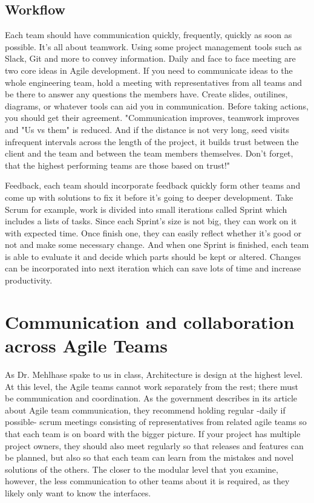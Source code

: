 \documentclass[sigplan,screen]{acmart}
\begin{document}
\subsection{Workflow}
Each team should have communication quickly, frequently, quickly as soon as possible. It's all about teamwork. Using some project management tools such as Slack, Git and more to convey information. Daily and face to face meeting are two core ideas in Agile development. If you need to communicate ideas to the whole engineering team, hold a meeting with representatives from all teams and be there to answer any questions the members have. Create slides, outilines, diagrams, or whatever tools can aid you in communication. \cite{Lulit} Before taking actions, you should get their agreement. "Communication improves, teamwork improves and "Us vs them" is reduced. And if the distance is not very long, seed visits infrequent intervals across the length of the project, it builds trust between the client and the team and between the team members themselves. Don't forget, that the highest performing teams are those based on trust!"\cite{David}

Feedback, each team should incorporate feedback quickly form other teams and come up with solutions to fix it before it's going to deeper development. Take Scrum for example, work is divided into small iterations called Sprint which includes a lists of tasks. Since each Sprint's size is not big, they can work on it with expected time. Once finish one, they can easily reflect whether it's good or not and make some necessary change. And when one Sprint is finished, each team is able to evaluate it and decide which parts should be kept or altered. Changes can be incorporated  into next iteration which can save lots of time and increase productivity.

\section{Communication and collaboration across Agile Teams}
As Dr. Mehlhase spake to us in class, Architecture is design at the highest level. At this level, the Agile teams cannot work separately from the rest; there must be communication and coordination. As the government describes in its article about Agile team communication, they recommend holding regular -daily if possible- scrum meetings consisting of representatives from related agile teams so that each team is on board with the bigger picture. \cite{Lulit} If your project has multiple project owners, they should also meet regularly so that releases and features can be planned, but also so that each team can learn from the mistakes and novel solutions of the others. \cite{Lulit} The closer to the modular level that you examine, however, the less communication to other teams about it is required, as they likely only want to know the interfaces. 
\end{document}

